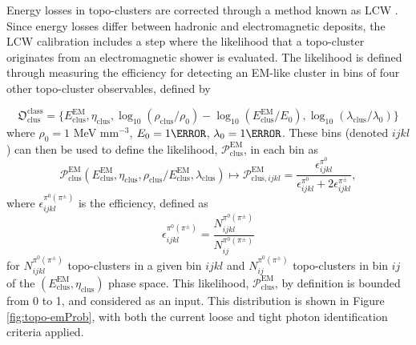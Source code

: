 Energy losses in topo-clusters are corrected through a method known as \gls{LCW} \cite{lcw-calib}. Since energy losses differ between hadronic and electromagnetic deposits, the \gls{LCW} calibration includes a step where the likelihood that a topo-cluster originates from an electromagnetic shower is evaluated. The likelihood is defined through measuring the efficiency for detecting an EM-like cluster in bins of four other topo-cluster observables, defined by

\begin{equation}
    \mathfrak{O}_{\text{clus}}^{\text{class}} = \{
        E_{\text{clus}}^{\text{EM}},
        \eta_{\text{clus}},
        \log_{10}(\rho_{\text{clus}} / \rho_{\text{0}}) - \log_{10}(E_{\text{clus}}^{\text{EM}} / E_{\text{0}}),
        \log_{10}(\lambda_{\text{clus}} / \lambda_{\text{0}})
    \}
\end{equation}
where $\rho_0 = 1$ MeV mm$^{-3}$, $E_0 = \unit{1}{\MeV}$, $\lambda_{0} = \unit{1}{\mm}$. These bins (denoted $ijkl$) can then be used to define the likelihood, $ \mathcal{P}_{\text{clus}}^{\text{EM}}$, in each bin as
\begin{equation}
    \mathcal{P}_{\text{clus}}^{\text{EM}} ( E_{\text{clus}}^{\text{EM}}, \eta_{\text{clus}}, \rho_{\text{clus}} / E_{\text{clus}}^{\text{EM}}, \lambda_{\text{clus}}) \mapsto \mathcal{P}_{\text{clus}, ijkl}^{\text{EM}}  = \frac{\epsilon^{\pi^0}_{ijkl}}{ \epsilon^{\pi^0}_{ijkl} + 2\epsilon^{\pi^\pm}_{ijkl}},
\end{equation}
where $\epsilon^{\pi^0(\pi^\pm)}_{ijkl}$ is the efficiency, defined as
\begin{equation}
    \epsilon^{\pi^0(\pi^\pm)}_{ijkl} = \frac{ N^{\pi^0(\pi^\pm)}_{ijkl} }{N^{\pi^0(\pi^\pm)}_{ij}}
\end{equation}
for $N^{\pi^0(\pi^\pm)}_{ijkl}$ topo-clusters in a given bin $ijkl$ and $N^{\pi^0(\pi^\pm)}_{ij}$ topo-clusters in bin $ij$ of the $(E_{\text{clus}}^{\text{EM}}, \eta_{\text{clus}})$ phase space. This likelihood, $\mathcal{P}_{\text{clus}}^{\text{EM}}$, by definition is bounded from 0 to 1, and considered as an input. This distribution is shown in Figure \ref{fig:topo-emProb}, with both the current loose and tight photon identification criteria applied.

